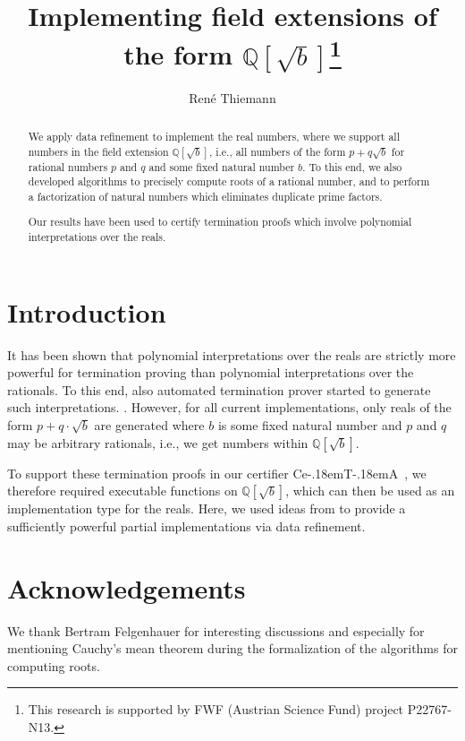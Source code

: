 \documentclass[11pt,a4paper]{article}
\newcommand\ceta{\textsf{Ce\kern-.18emT\kern-.18emA}}
\newcommand\rats{\mathbb{Q}}
\newcommand\fieldext[2]{#1[#2]}
\newcommand\ratsb{\fieldext\rats{\sqrt b}}
\begin{document}
\title{Implementing field extensions of the form $\ratsb$\thanks{This research is supported by FWF (Austrian Science Fund) project P22767-N13.}}
\author{Ren\'e Thiemann}
\maketitle

\begin{abstract}
  We apply data refinement to implement the real numbers, where we support
  all numbers in the field extension $\ratsb$, i.e., all numbers of the 
  form $p + q \sqrt{b}$ for rational numbers $p$ and $q$ and some fixed natural
  number $b$. To this end, we also developed algorithms to precisely compute
  roots of a rational number, and to perform a factorization of natural 
  numbers which eliminates duplicate prime factors.
  
  Our results have been used to certify termination proofs which involve
  polynomial interpretations over the reals.  
\end{abstract}



\tableofcontents

\section{Introduction}

It has been shown that polynomial
interpretations over the reals are strictly more powerful for termination
proving than polynomial interpretations over the rationals. To this end,
also automated termination prover started to generate such interpretations.
\cite{Rational,Luc06,Luc07,LPAR09,SCSS10}. However, for all current implementations,
only reals of the form $p + q \cdot \sqrt{b}$ are generated where $b$ is some fixed
natural number and $p$ and $q$ may be arbitrary rationals, i.e., we get
numbers within $\ratsb$.

To support these termination proofs in our certifier \ceta\ \cite{CeTA}, 
we therefore required executable functions on $\ratsb$, which can then
be used as an implementation type for the reals. Here, we used ideas from
\cite{datarefinement,Loc13} to provide a sufficiently powerful 
partial implementations via data refinement.




\section*{Acknowledgements}
We thank Bertram Felgenhauer for interesting discussions and especially
for mentioning Cauchy's mean theorem during the formalization of
the algorithms for computing roots.



\end{document}
